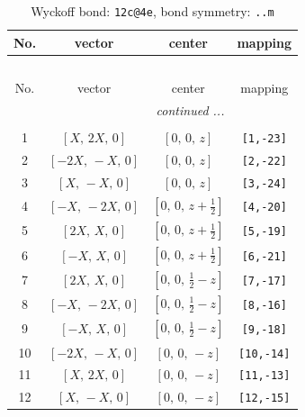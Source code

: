 \documentclass[fleqn,8pt]{jsarticle}
\begin{document}
\renewcommand{\arraystretch}{1.2}
\begin{longtable}{cccc}
\caption{Wyckoff bond: {\tt 12c@4e}, bond symmetry: {\tt ..m}}
 \\
 \hline \hline
No. & vector & center & mapping \\ \hline \endfirsthead

\multicolumn{3}{l}{\tablename\ \thetable{}} \\
 \hline \hline
No. & vector & center & mapping \\ \hline \endhead

 \hline \hline
\multicolumn{3}{r}{\footnotesize\it continued ...} \\ \endfoot

 \hline \hline
\multicolumn{3}{r}{} \\ \endlastfoot

1 & $\left[ X,\, 2 X,\, 0 \right]$ & $\left[ 0,\, 0,\, z \right]$ & {\tt [1,-23]} \\ \hline
2 & $\left[ - 2 X,\, - X,\, 0 \right]$ & $\left[ 0,\, 0,\, z \right]$ & {\tt [2,-22]} \\ \hline
3 & $\left[ X,\, - X,\, 0 \right]$ & $\left[ 0,\, 0,\, z \right]$ & {\tt [3,-24]} \\ \hline
4 & $\left[ - X,\, - 2 X,\, 0 \right]$ & $\left[ 0,\, 0,\, z + \frac{1}{2} \right]$ & {\tt [4,-20]} \\ \hline
5 & $\left[ 2 X,\, X,\, 0 \right]$ & $\left[ 0,\, 0,\, z + \frac{1}{2} \right]$ & {\tt [5,-19]} \\ \hline
6 & $\left[ - X,\, X,\, 0 \right]$ & $\left[ 0,\, 0,\, z + \frac{1}{2} \right]$ & {\tt [6,-21]} \\ \hline
7 & $\left[ 2 X,\, X,\, 0 \right]$ & $\left[ 0,\, 0,\, \frac{1}{2} - z \right]$ & {\tt [7,-17]} \\ \hline
8 & $\left[ - X,\, - 2 X,\, 0 \right]$ & $\left[ 0,\, 0,\, \frac{1}{2} - z \right]$ & {\tt [8,-16]} \\ \hline
9 & $\left[ - X,\, X,\, 0 \right]$ & $\left[ 0,\, 0,\, \frac{1}{2} - z \right]$ & {\tt [9,-18]} \\ \hline
10 & $\left[ - 2 X,\, - X,\, 0 \right]$ & $\left[ 0,\, 0,\, - z \right]$ & {\tt [10,-14]} \\ \hline
11 & $\left[ X,\, 2 X,\, 0 \right]$ & $\left[ 0,\, 0,\, - z \right]$ & {\tt [11,-13]} \\ \hline
12 & $\left[ X,\, - X,\, 0 \right]$ & $\left[ 0,\, 0,\, - z \right]$ & {\tt [12,-15]} \\
\end{longtable}
\end{document}
